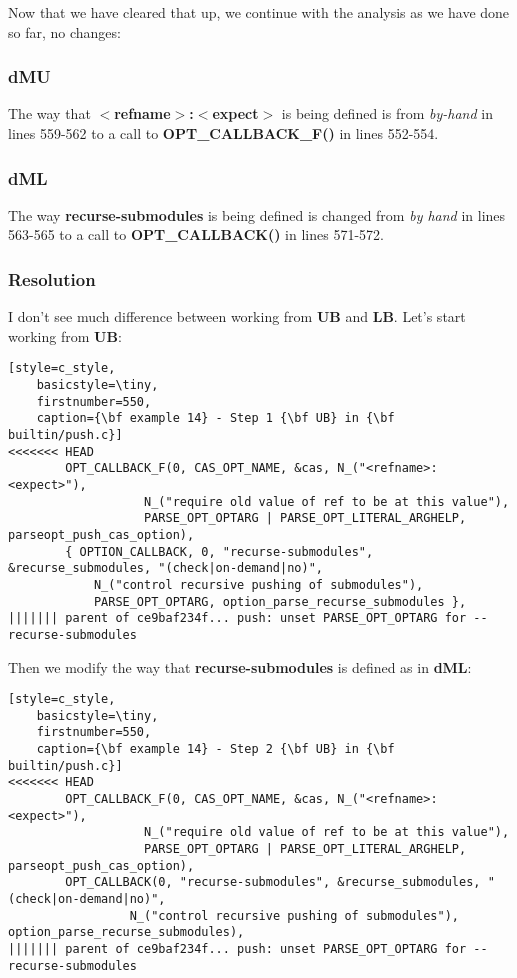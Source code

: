 Now that we have cleared that up, we continue with the analysis as we have done so far, no changes:

\subsubsection{dMU}
The way that {\bf $<$refname$>$:$<$expect$>$} is being defined is from {\it by-hand} in lines 559-562 to a call to {\bf OPT\_CALLBACK\_F()}
in lines 552-554.

\subsubsection{dML}
The way {\bf recurse-submodules} is being defined is changed from {\it by hand} in lines 563-565 to a call to {\bf OPT\_CALLBACK()}
in lines 571-572.

\subsubsection{Resolution}
I don't see much difference between working from {\bf UB } and {\bf LB}. Let's start working from {\bf UB}:

\begin{lstlisting}[style=c_style,
	basicstyle=\tiny,
	firstnumber=550,
	caption={\bf example 14} - Step 1 {\bf UB} in {\bf builtin/push.c}]
<<<<<<< HEAD
		OPT_CALLBACK_F(0, CAS_OPT_NAME, &cas, N_("<refname>:<expect>"),
			       N_("require old value of ref to be at this value"),
			       PARSE_OPT_OPTARG | PARSE_OPT_LITERAL_ARGHELP, parseopt_push_cas_option),
		{ OPTION_CALLBACK, 0, "recurse-submodules", &recurse_submodules, "(check|on-demand|no)",
			N_("control recursive pushing of submodules"),
			PARSE_OPT_OPTARG, option_parse_recurse_submodules },
||||||| parent of ce9baf234f... push: unset PARSE_OPT_OPTARG for --recurse-submodules
\end{lstlisting}

Then we modify the way that {\bf recurse-submodules} is defined as in {\bf dML}:
\begin{lstlisting}[style=c_style,
	basicstyle=\tiny,
	firstnumber=550,
	caption={\bf example 14} - Step 2 {\bf UB} in {\bf builtin/push.c}]
<<<<<<< HEAD
		OPT_CALLBACK_F(0, CAS_OPT_NAME, &cas, N_("<refname>:<expect>"),
			       N_("require old value of ref to be at this value"),
			       PARSE_OPT_OPTARG | PARSE_OPT_LITERAL_ARGHELP, parseopt_push_cas_option),
		OPT_CALLBACK(0, "recurse-submodules", &recurse_submodules, "(check|on-demand|no)",
			     N_("control recursive pushing of submodules"), option_parse_recurse_submodules),
||||||| parent of ce9baf234f... push: unset PARSE_OPT_OPTARG for --recurse-submodules
\end{lstlisting}

